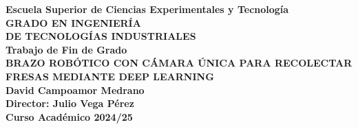 \newpage
{
\color{white}
\pagecolor[rgb]{0,0.125,0.357} %

\thispagestyle{empty}

\begin{figure}[H]
  \centerline{}
\end{figure}

\begin{center}
  {\large {\bf Escuela Superior de Ciencias Experimentales y Tecnología}}\\[1.2cm]
  {\large {\bf GRADO EN INGENIERÍA\\ 
  DE TECNOLOGÍAS INDUSTRIALES}}\\[2cm]
  {\large {\bf Trabajo de Fin de Grado}}\\[1.2cm]
  {\Large{\bf BRAZO ROBÓTICO CON CÁMARA ÚNICA PARA RECOLECTAR FRESAS MEDIANTE DEEP LEARNING}}\\[2cm]
  {\large {\bf David Campoamor Medrano}}\\[2cm]
  {\large {\bf Director: Julio Vega Pérez}}\\[0.35cm]
  {\large {\bf Curso Académico 2024/25}}\\[1cm]
  
\end{center}

\clearpage
\nopagecolor
}


